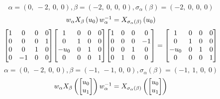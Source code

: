 \documentclass[11pt]{article}
\theoremstyle{definition}
\begin{document}
\[
\alpha = \left( 0, \  -2, \  0, \  0\right), \beta = \left( -2, \  0, \  0, \  0\right), \sigma_{\alpha}(\beta) = \left( -2, \  0, \  0, \  0\right)
\]
\[
\scaletoalign{\textwidth}{w_{\alpha} X_{\beta}\left(u_{0}\right) w_{\alpha}^{-1} = X_{\sigma_{\alpha}\left(\beta\right)}\left(u_{0}\right)}
\]
\[
\scaletoalign{\textwidth}{{\left[\begin{matrix}1 & 0 & 0 & 0\\0 & 0 & 0 & 1\\0 & 0 & 1 & 0\\0 & -1 & 0 & 0\end{matrix}\right]} {\left[\begin{matrix}1 & 0 & 0 & 0\\0 & 1 & 0 & 0\\- u_{0} & 0 & 1 & 0\\0 & 0 & 0 & 1\end{matrix}\right]} {\left[\begin{matrix}1 & 0 & 0 & 0\\0 & 0 & 0 & -1\\0 & 0 & 1 & 0\\0 & 1 & 0 & 0\end{matrix}\right]} = {\left[\begin{matrix}1 & 0 & 0 & 0\\0 & 1 & 0 & 0\\- u_{0} & 0 & 1 & 0\\0 & 0 & 0 & 1\end{matrix}\right]}}
\]
\[
\alpha = \left( 0, \  -2, \  0, \  0\right), \beta = \left( -1, \  -1, \  0, \  0\right), \sigma_{\alpha}(\beta) = \left( -1, \  1, \  0, \  0\right)
\]
\[
\scaletoalign{\textwidth}{w_{\alpha} X_{\beta}\left(\left[\begin{matrix}u_{0}\\u_{1}\end{matrix}\right]\right) w_{\alpha}^{-1} = X_{\sigma_{\alpha}\left(\beta\right)}\left(\left[\begin{matrix}u_{0}\\u_{1}\end{matrix}\right]\right)}
\]
\end{document}

